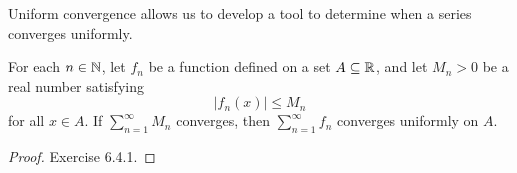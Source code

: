 Uniform convergence allows us to develop a tool to determine when a series converges uniformly.

\begin{corollary}
    For each \( n \in \mathbb{N}  \), let \( f_n  \) be a function defined on a set \( A \subseteq \mathbb{R}  \), and let \( M_n > 0  \) be a real number satisfying
    \[  | f_n(x)  | \leq M_n \] for all \( x \in A  \). If \( \sum_{ n=1 }^{ \infty  } M_n  \) converges, then \( \sum_{ n=1 }^{ \infty  } f_n  \) converges uniformly on \( A  \).
    \end{corollary}

\begin{proof}
Exercise 6.4.1.
\end{proof}

